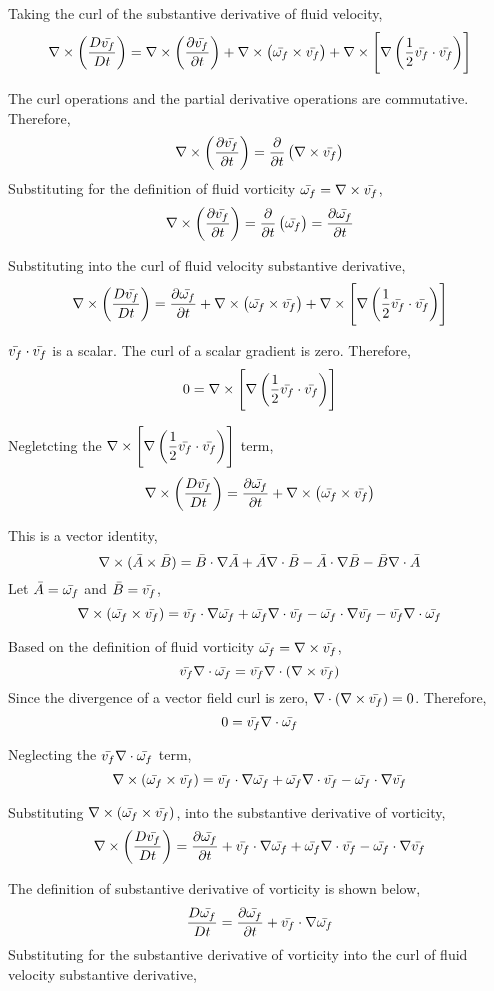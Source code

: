 \documentclass[a4paper, 12pt]{report}
\begin{document}
\begin{center}
Taking the curl of the substantive derivative of fluid velocity,
$$\nabla\times\left(\frac{D \bar{v_f}}{Dt}\right) = \nabla\times\left(\frac{\partial \bar{v_f}}{\partial t}\right) + \nabla\times\left(\bar{\omega_f}\times \bar{v_f}\right) + \nabla\times\left[\nabla\left(\frac{1}{2}\bar{v_f}\cdot\bar{v_f}\right)\right]$$

The curl operations and the partial derivative operations are commutative. Therefore,
$$\nabla\times\left(\frac{\partial \bar{v_f}}{\partial t}\right) = \frac{\partial }{\partial t}\left(\nabla\times\bar{v_f}\right)$$
Substituting for the definition of fluid vorticity $\displaystyle \bar{\omega_f} = \nabla\times \bar{v_f}$,
$$\nabla\times\left(\frac{\partial \bar{v_f}}{\partial t}\right) = \frac{\partial }{\partial t}\left(\bar{\omega_f}\right) = \frac{\partial \bar{\omega_f}}{\partial t}$$

Substituting into the curl of fluid velocity substantive derivative,
$$\nabla\times\left(\frac{D \bar{v_f}}{Dt}\right) = \frac{\partial \bar{\omega_f}}{\partial t} + \nabla\times\left(\bar{\omega_f}\times \bar{v_f}\right) + \nabla\times\left[\nabla\left(\frac{1}{2}\bar{v_f}\cdot\bar{v_f}\right)\right]$$

$\bar{v_f}\cdot\bar{v_f}$ is a scalar. The curl of a scalar gradient is zero. Therefore,
$$0 = \nabla\times\left[\nabla\left(\frac{1}{2}\bar{v_f}\cdot\bar{v_f}\right)\right]$$

Negletcting the $\displaystyle \nabla\times\left[\nabla\left(\frac{1}{2}\bar{v_f}\cdot\bar{v_f}\right)\right]$ term,
$$\nabla\times\left(\frac{D \bar{v_f}}{Dt}\right) = \frac{\partial \bar{\omega_f}}{\partial t} + \nabla\times\left(\bar{\omega_f}\times \bar{v_f}\right)$$

This is a vector identity,
$$\nabla\times (\bar{A}\times \bar{B}) = \bar{B}\cdot\nabla \bar{A} + \bar{A}\nabla\cdot \bar{B} - \bar{A}\cdot\nabla \bar{B} - \bar{B}\nabla\cdot \bar{A}$$
Let $\bar{A} = \bar{\omega_f}$ and $\bar{B} = \bar{v_f}$,
$$\nabla\times (\bar{\omega_f}\times \bar{v_f}) = \bar{v_f}\cdot\nabla \bar{\omega_f} + \bar{\omega_f}\nabla\cdot \bar{v_f} - \bar{\omega_f}\cdot\nabla \bar{v_f} - \bar{v_f}\nabla\cdot \bar{\omega_f}$$

Based on the definition of fluid vorticity $\bar{\omega_f} = \nabla\times\bar{v_f}$,
$$\bar{v_f}\nabla\cdot \bar{\omega_f} = \bar{v_f}\nabla\cdot (\nabla\times\bar{v_f})$$
Since the divergence of a vector field curl is zero, $\displaystyle \nabla\cdot (\nabla\times\bar{v_f})=0$. Therefore,
$$0 = \bar{v_f}\nabla\cdot \bar{\omega_f}$$

Neglecting the $\displaystyle \bar{v_f}\nabla\cdot \bar{\omega_f}$ term,
$$\nabla\times (\bar{\omega_f}\times \bar{v_f}) = \bar{v_f}\cdot\nabla \bar{\omega_f} + \bar{\omega_f}\nabla\cdot \bar{v_f} - \bar{\omega_f}\cdot\nabla \bar{v_f}$$


Substituting $\displaystyle \nabla\times (\bar{\omega_f}\times \bar{v_f})$, into the substantive derivative of vorticity,
$$\nabla\times\left(\frac{D \bar{v_f}}{Dt}\right) = \frac{\partial \bar{\omega_f}}{\partial t} + \bar{v_f}\cdot\nabla \bar{\omega_f} + \bar{\omega_f}\nabla\cdot \bar{v_f} - \bar{\omega_f}\cdot\nabla \bar{v_f}$$



The definition of substantive derivative of vorticity is shown below,
$$\frac{D \bar{\omega_f}}{Dt} = \frac{\partial \bar{\omega_f}}{\partial t} + \bar{v_f}\cdot\nabla \bar{\omega_f}$$
Substituting for the substantive derivative of vorticity into the curl of fluid velocity substantive derivative,


\end{center}
\end{document}
